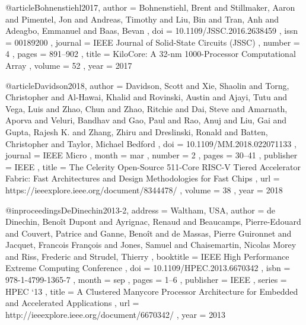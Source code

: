 @article{Bohnenstiehl2017,
	author  = { Bohnenstiehl, Brent and
		        Stillmaker, Aaron and
			    Pimentel, Jon and
				Andreas, Timothy and
				Liu, Bin and
				Tran, Anh and
				Adeagbo, Emmanuel and
				Baas, Bevan
	},
	doi     = { 10.1109/JSSC.2016.2638459 },
	issn    = { 00189200 },
	journal = { IEEE Journal of Solid-State Circuits (JSSC) },
	number  = { 4 },
	pages   = { 891--902 },
	title   = { KiloCore: A 32-nm 1000-Processor Computational Array },
	volume  = { 52 },
	year    = { 2017 }
}

@article{Davidson2018,
	author    = { Davidson, Scott and
		          Xie, Shaolin and
				  Torng, Christopher and
				  Al-Hawai, Khalid and
				  Rovinski, Austin and
				  Ajayi, Tutu and
				  Vega, Luis and
				  Zhao, Chun and
				  Zhao, Ritchie and
				  Dai, Steve and
				  Amarnath, Aporva and
				  Veluri, Bandhav and
				  Gao, Paul and
				  Rao, Anuj and
				  Liu, Gai and
				  Gupta, Rajesh K. and
				  Zhang, Zhiru and
				  Dreslinski, Ronald and
				  Batten, Christopher and
				  Taylor, Michael Bedford
	},
	doi       = { 10.1109/MM.2018.022071133 },
	journal   = { IEEE Micro },
	month     = { mar },
	number    = { 2 },
	pages     = { 30--41 },
	publisher = { IEEE },
	title     = { The Celerity Open-Source 511-Core RISC-V Tiered Accelerator Fabric:
		          Fast Architectures and Design Methodologies for Fast Chips
	},
	url       = { https://ieeexplore.ieee.org/document/8344478/ },
	volume    = { 38 },
	year      = { 2018 }
}

@inproceedings{DeDinechin2013-2,
    address   = { Waltham, USA},
    author    = { de Dinechin, Beno{\^{i}}t Dupont and
                  Ayrignac, Renaud and
                  Beaucamps, Pierre-Edouard and
                  Couvert, Patrice and
                  Ganne, Beno{\^{i}}t and
                  de Massas, Pierre Guironnet and
                  Jacquet, Francois Fran{\c{c}}ois and
                  Jones, Samuel and
                  Chaisemartin, Nicolas Morey and
                  Riss, Frederic and
                  Strudel, Thierry
    },
    booktitle = { IEEE High Performance Extreme Computing Conference },
    doi       = { 10.1109/HPEC.2013.6670342 },
    isbn      = { 978-1-4799-1365-7 },
    month     = { sep },
    pages     = { 1--6 },
    publisher = { IEEE },
    series    = { HPEC `13 },
    title     = { A Clustered Manycore Processor Architecture for Embedded and Accelerated Applications },
    url       = { http://ieeexplore.ieee.org/document/6670342/ },
    year      = { 2013 }
}


